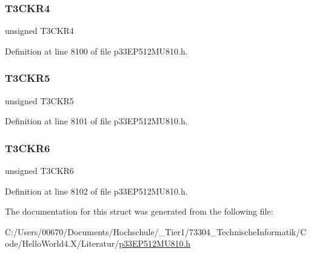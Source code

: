 \subsubsection{\texorpdfstring{T3\+C\+K\+R4}{T3CKR4}}
{\footnotesize\ttfamily unsigned T3\+C\+K\+R4}



Definition at line 8100 of file p33\+E\+P512\+M\+U810.\+h.

\mbox{\label{structtag_r_p_i_n_r3_b_i_t_s_a9669831d8dd04b2b2f8dbf0d1d2c7bbb}} 
\subsubsection{\texorpdfstring{T3\+C\+K\+R5}{T3CKR5}}
{\footnotesize\ttfamily unsigned T3\+C\+K\+R5}



Definition at line 8101 of file p33\+E\+P512\+M\+U810.\+h.

\mbox{\label{structtag_r_p_i_n_r3_b_i_t_s_a275a5f0196b1fd371bbdd26051395f44}} 
\subsubsection{\texorpdfstring{T3\+C\+K\+R6}{T3CKR6}}
{\footnotesize\ttfamily unsigned T3\+C\+K\+R6}



Definition at line 8102 of file p33\+E\+P512\+M\+U810.\+h.



The documentation for this struct was generated from the following file\+:\begin{DoxyCompactItemize}
\item 
C\+:/\+Users/00670/\+Documents/\+Hochschule/\+\_\+\+Tier1/73304\+\_\+\+Technische\+Informatik/\+Code/\+Hello\+World4.\+X/\+Literatur/\hyperlink{p33_e_p512_m_u810_8h}{p33\+E\+P512\+M\+U810.\+h}\end{DoxyCompactItemize}

